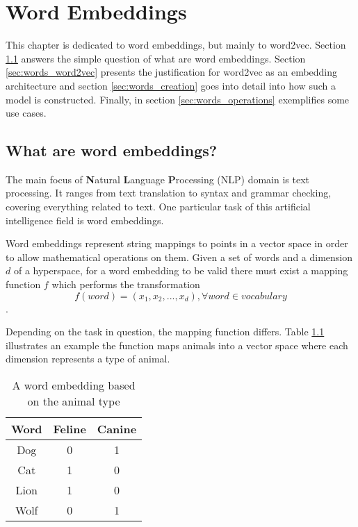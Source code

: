 \chapter{Word Embeddings}
\label{chap:words}

This chapter is dedicated to word embeddings, but mainly to word2vec. Section \ref{sec:words_what} answers the simple question of what are word embeddings. Section \ref{sec:words_word2vec} presents the justification for word2vec as an embedding architecture and section \ref{sec:words_creation} goes into detail into how such a model is constructed. Finally, in section \ref{sec:words_operations} exemplifies some use cases.

\section{What are word embeddings?}
\label{sec:words_what}

The main focus of \textbf{N}atural \textbf{L}anguage \textbf{P}rocessing (NLP) domain is text processing. It ranges from text translation to syntax and grammar checking, covering everything related to text. One particular task of this artificial intelligence field is word embeddings.

Word embeddings represent string mappings to points in a vector space in order to allow mathematical operations on them. Given a set of words and a dimension $d$ of a hyperspace, for a word embedding to be valid there must exist a mapping function $f$ which performs the transformation $$ f(word) = (x_1, x_2, ... , x_d),  \forall word \in vocabulary$$. 

Depending on the task in question, the mapping function differs. Table \ref{table:embedding} illustrates an example the function maps animals into a vector space where each dimension represents a type of animal.

\begin{table}[b!]
\centering
\label{table:embedding}
\begin{tabular}{| | c c c | |}
	\hline
		 Word & Feline & Canine \\
	\hline
		Dog & 0 & 1 \\
		Cat  & 1 & 0 \\
		Lion & 1 & 0 \\
		Wolf & 0 & 1 \\
\hline
\end{tabular}
\caption{A word embedding based on the animal type}
\end{table}

